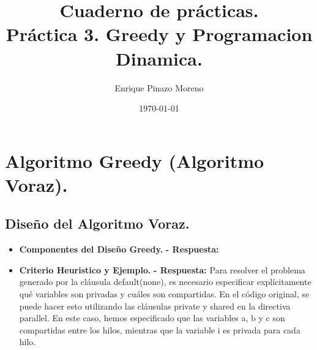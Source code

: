 \documentclass[12pt, letterpaper]{article}
\title{Cuaderno de prácticas. \\Práctica 3. Greedy y Programacion Dinamica.}
\author{Enrique Pinazo Moreno}
\date{\today}
\begin{document}
  \maketitle
  \tableofcontents
  \newpage %

  \section{Algoritmo Greedy (Algoritmo Voraz).}
    \subsection{Diseño del Algoritmo Voraz.}
      \begin{itemize}
        \item \textbf{Componentes del Diseño Greedy.}
          \subitem\textbf{- Respuesta:}
             
        \item \textbf{Criterio Heuristico y Ejemplo.}
          \subitem\textbf{- Respuesta:}
            Para resolver el problema generado por la cláusula default(none), es necesario especificar explícitamente qué variables son privadas y cuáles son compartidas. 
            En el código original, se puede hacer esto utilizando las cláusulas private y shared en la directiva parallel. 
            \newline En este caso, hemos especificado que las variables a, b y c son compartidas entre los hilos, mientras que la variable i es privada para cada hilo.
            
            \newpage %
      \end{itemize}
    
    \newpage %
\end{document}
